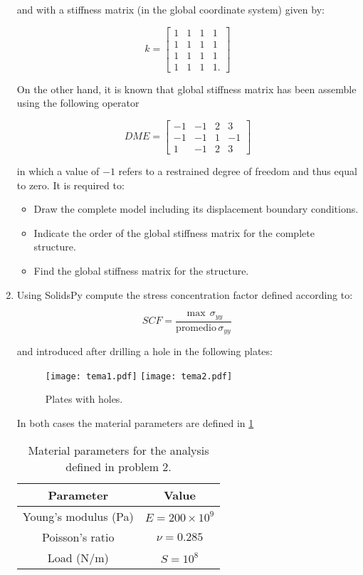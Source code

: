 \begin{enumerate}
and with a stiffness matrix (in the global coordinate system) given by:

\[
k = \begin{bmatrix}1&1&1&1\\1&1&1&1\\1&1&1&1\\1&1&1&1.
\end{bmatrix}
\]

On the other hand, it is known that global stiffness matrix has been assemble using the following operator

\[
DME = \begin{bmatrix}-1&-1&2&3\\-1&-1&1&-1\\1&-1&2&3\end{bmatrix}
\]

in which a value of $-1$ refers to a restrained degree of freedom and thus equal to zero. It is required to:

\begin{itemize}
\item Draw the complete model including its displacement boundary conditions.
\item Indicate the order of the global stiffness matrix for the complete structure.
\item Find the global stiffness matrix for the structure.
\end{itemize}





\item \label{punto05} Using SolidsPy compute the stress concentration factor defined according to:

\[SCF = \frac{\max\, \sigma_{yy}}{\text{promedio}\, \sigma_{yy}}\, \]

and introduced after drilling a hole in the following plates:

\begin{figure}[H]
	\centering
	\texttt{[image: tema1.pdf]}
	\texttt{[image: tema2.pdf]}
	\caption{Plates with holes.}
	\label{fig:tema1}
\end{figure}

In both cases the material parameters are defined in \cref{tab:comun}

\begin{table}[H]
    \centering
    \begin{tabular}{cc}
        \hline
        Parameter & Value \\
        \hline
        Young's modulus (Pa)    & $E =200 \times 10^9$ \\
        Poisson's ratio    & $\nu = 0.285$   \\
        Load (N/m)   & $S = 10^8$  \\
        \hline
    \end{tabular}
    \caption{Material parameters for the analysis defined in problem 2.}
    \label{tab:comun}
\end{table}


\end{enumerate}
